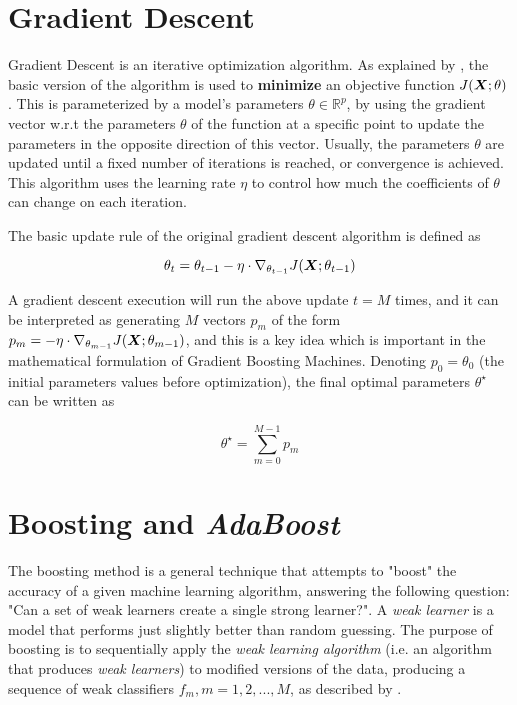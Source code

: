 \section{Gradient Descent}
\label{Gradient Descent}

Gradient Descent is an iterative optimization algorithm. As explained by \cite{Ruder2016AnOO}, the basic version of the algorithm is used to \textbf{minimize} an objective function $J(\bm{X};\theta)$. This is parameterized by a model's parameters $\theta \in \mathbb{R}^p$, by using the gradient vector w.r.t the parameters $\theta$ of the function at a specific point to update the parameters in the opposite direction of this vector. Usually, the parameters $\theta$ are updated until a fixed number of iterations is reached, or convergence is achieved. This algorithm uses the learning rate $\eta$ to control how much the coefficients of $\theta$ can change on each iteration.

The basic update rule of the original gradient descent algorithm is defined as

\begin{equation}\label{eq:gradientDescent-update}
    \theta_t = \theta_{t-1} - \eta \cdot \nabla_{\theta_{t-1}} J(\bm{X};\theta_{t-1})  
\end{equation}

\noindent A gradient descent execution will run the above update $t=M$ times, and it can be interpreted as generating $M$ vectors $p_m$ of the form $p_m = -\eta\cdot\nabla_{\theta_{m-1}}J(\bm{X};\theta_{m-1})$, and  this is a key idea which is important in the mathematical formulation of Gradient Boosting Machines. 
Denoting $p_0 = \theta_0$ (the initial parameters values before optimization), the final optimal parameters $\theta^\star$ can be written as

\begin{equation}\label{eq:gradientDescent-params}
    \theta^\star = \sum_{m=0}^{M - 1}p_m
\end{equation}

\section{Boosting and \textit{AdaBoost}}

The boosting method is a general technique that attempts to "boost" the accuracy of a given machine learning algorithm, answering the following question: "Can a set of weak learners create a single strong learner?". A \textit{weak learner} is a model that performs just slightly better than random guessing. The purpose of boosting is to sequentially apply the \textit{weak learning algorithm} (i.e. an algorithm that produces \textit{weak learners}) to modified versions of the data, producing a sequence of weak classifiers $f_m, m = 1, 2, ..., M$, as described by \cite{hastie2009elements}. 

